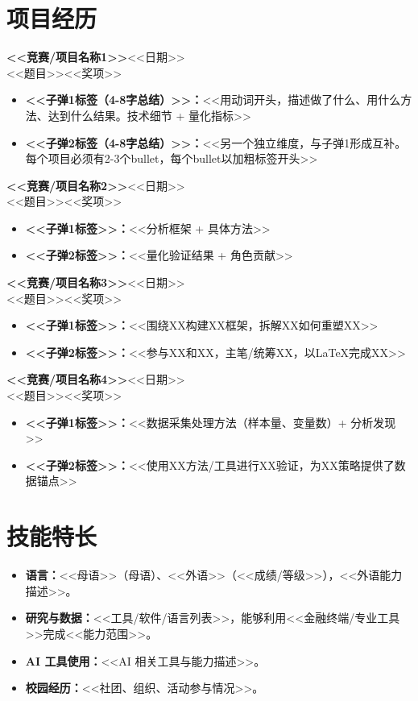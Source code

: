\documentclass[a4paper, 10pt]{article}
\newcommand{\workentry}[4]{%
  \noindent\textbf{#1}\hfill{\small #2}\\[-2pt]
  {\kaishu\small #3}\hfill{\kaishu\small #4}\par\vspace{1.5pt}%
}
\begin{document}
\section{项目经历}

\workentry{<<竞赛/项目名称1>>}{<<日期>>}{<<题目>>}{<<奖项>>}
\begin{itemize}
  \item \textbf{<<子弹1标签（4-8字总结）>>：}<<用动词开头，描述做了什么、用什么方法、达到什么结果。技术细节 + 量化指标>>
  \item \textbf{<<子弹2标签（4-8字总结）>>：}<<另一个独立维度，与子弹1形成互补。每个项目必须有2-3个bullet，每个bullet以加粗标签开头>>
\end{itemize}

\workentry{<<竞赛/项目名称2>>}{<<日期>>}{<<题目>>}{<<奖项>>}
\begin{itemize}
  \item \textbf{<<子弹1标签>>：}<<分析框架 + 具体方法>>
  \item \textbf{<<子弹2标签>>：}<<量化验证结果 + 角色贡献>>
\end{itemize}

\workentry{<<竞赛/项目名称3>>}{<<日期>>}{<<题目>>}{<<奖项>>}
\begin{itemize}
  \item \textbf{<<子弹1标签>>：}<<围绕XX构建XX框架，拆解XX如何重塑XX>>
  \item \textbf{<<子弹2标签>>：}<<参与XX和XX，主笔/统筹XX，以LaTeX完成XX>>
\end{itemize}

\workentry{<<竞赛/项目名称4>>}{<<日期>>}{<<题目>>}{<<奖项>>}
\begin{itemize}
  \item \textbf{<<子弹1标签>>：}<<数据采集处理方法（样本量、变量数）+ 分析发现>>
  \item \textbf{<<子弹2标签>>：}<<使用XX方法/工具进行XX验证，为XX策略提供了数据锚点>>
\end{itemize}

\section{技能特长}

\begin{itemize}
  \item \textbf{语言：}<<母语>>（母语）、<<外语>>（<<成绩/等级>>），<<外语能力描述>>。
  \item \textbf{研究与数据：}<<工具/软件/语言列表>>，能够利用<<金融终端/专业工具>>完成<<能力范围>>。
  \item \textbf{AI 工具使用：}<<AI 相关工具与能力描述>>。
  \item \textbf{校园经历：}<<社团、组织、活动参与情况>>。
\end{itemize}
\end{document}
